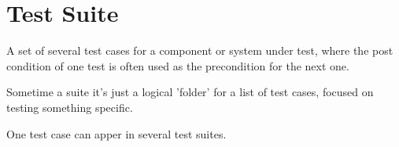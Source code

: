 \section{Test Suite}
\label{sec:Test Suite}

A set of several test cases for a component or system under test, where the post condition of one test is often used as the precondition for the next one.

Sometime a suite it's just a logical 'folder' for a list of test cases, focused on testing something specific.

One test case can apper in several test suites.